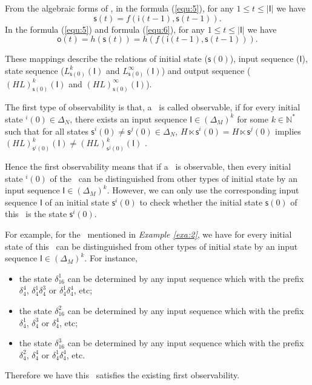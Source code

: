   
  
  From the algebraic forms of \BCNs, in the formula (\ref{equ:5}), for any $1\le t \le |\mathsf{I}|$ we have 
 \[\mathsf{s}(t)=f(\mathsf{i}(t-1),\mathsf{s}(t-1)).\] 
 In the formula (\ref{equ:5}) and formula (\ref{equ:6}), for any $1\le t \le |\mathsf{I}|$ we have  
 \[\mathsf{o}(t)=h(\mathsf{s}(t))=h(f(\mathsf{i}(t-1),\mathsf{s}(t-1))).\] 

These mappings describe the relations of initial state ($\mathsf{s}(0)$), input sequence ($\mathsf{I}$), state sequence ($L^k_{\mathsf{s}(0)}(\mathsf{I})$ and $L^{\infty}_{\mathsf{s}(0)}(\mathsf{I})$) and output sequence ($(HL)^k_{\mathsf{s}(0)}(\mathsf{I})$ and $(HL)^{\infty}_{\mathsf{s}(0)}(\mathsf{I})$). 

\begin{definition} 
The first type of observability is that, a \BCN\ is called observable, if for every initial state \State$^{i}(0)$$\in \Delta_N$, there exists an input sequence $\mathsf{I}\in(\Delta_M)^k$ for some $k\in \mathbb{N}^*$ such that for all states $\mathsf{s}^{i}(0)\neq \mathsf{s}^{j}(0)\in \Delta_N$, $H\ltimes\mathsf{s}^{i}(0)=H\ltimes\mathsf{s}^{j}(0)$ implies $(HL)^k_{\mathsf{s}^{i}(0)}(\mathsf{I})\neq (HL)^k_{{\mathsf{s}^{j}(0)}}(\mathsf{I})$ \cite{cheng2009controllability}.
\end{definition}

Hence the first observability means that if a \BCN\ is observable, then every initial state \State$^{i}(0)$ of the \BCN\ can be distinguished from other types of initial state by an input sequence $\mathsf{I}\in(\Delta_M)^k$. However, we can only use the corresponding input sequence $\mathsf{I}$ of an initial state $\mathsf{s}^{i}(0)$ to check whether the initial state $\mathsf{s}(0)$ of this \BCN\ is the state $\mathsf{s}^{i}(0)$.
\begin{example}
For example, for the \BCN\ mentioned in {\em Example \ref{exa:2}}, we have for every initial state of this \BCN\ can be distinguished from other types of initial state by an input sequence $\mathsf{I}\in(\Delta_M)^k$.  For instance,
\begin{itemize}
  \item the state $\delta_{16}^1$ can be determined by any input sequence which with the prefix $\delta_{4}^4$, $\delta_{4}^1  \delta_{4}^3$ or $\delta_{4}^1 \delta_{4}^4$, etc;
  \item the state $\delta_{16}^2$ can be determined by any input sequence which with the prefix $\delta_{4}^1$, $\delta_{4}^3$ or $\delta_{4}^4$, etc;
  \item the state $\delta_{16}^3$ can be determined by any input sequence which with the prefix $\delta_{4}^2$, $\delta_{4}^4$ or $\delta_{4}^1 \delta_{4}^4$, etc.
\end{itemize} 

Therefore we have this \BCN\ satisfies the existing first observability.
\label{exa:4}
\end{example}   


